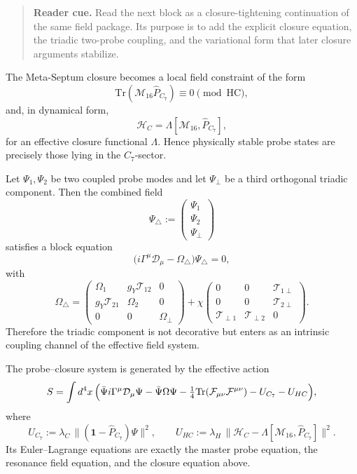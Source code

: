 \begin{quote}\small
\noindent\textbf{Reader cue.} Read the next block as a closure-tightening continuation of the same field package. Its purpose is to add the explicit closure equation, the triadic two-probe coupling, and the variational form that later closure arguments stabilize.
\end{quote}

\begin{proposition}
\label{prop:closure-equation}
The Meta-Septum closure becomes a local field constraint of the form
\[
  \mathrm{Tr}(\mathcal M_{16}\hat P_{C_7})
  \equiv 0 \pmod{\mathrm{HC}},
\]
and, in dynamical form,
\[
  \mathcal H_C = \Lambda[\mathcal M_{16},\hat P_{C_7}],
\]
for an effective closure functional $\Lambda$.
Hence physically stable probe states are precisely those lying in the
$C_7$-sector.
\end{proposition}

\begin{proposition}
\label{prop:triadic-two-probe}
Let $\Psi_1,\Psi_2$ be two coupled probe modes and let $\Psi_\perp$ be a
third orthogonal triadic component.
Then the combined field
\[
  \Psi_{\triangle}
  :=
  \begin{pmatrix}
    \Psi_1\\
    \Psi_2\\
    \Psi_\perp
  \end{pmatrix}
\]
satisfies a block equation
\[
  \bigl(i\Gamma^\mu\mathcal D_\mu - \Omega_{\triangle}\bigr)
  \Psi_{\triangle}=0,
\]
with
\[
  \Omega_{\triangle}
  =
  \begin{pmatrix}
    \Omega_1 & g_Y\mathcal T_{12} & 0\\
    g_Y\mathcal T_{21} & \Omega_2 & 0\\
    0 & 0 & \Omega_\perp
  \end{pmatrix}
  +
  \chi
  \begin{pmatrix}
    0 & 0 & \mathcal T_{1\perp}\\
    0 & 0 & \mathcal T_{2\perp}\\
    \mathcal T_{\perp1} & \mathcal T_{\perp2} & 0
  \end{pmatrix}.
\]
Therefore the triadic component is not decorative but enters as an
intrinsic coupling channel of the effective field system.
\end{proposition}

\begin{theorem}
\label{thm:variational-form}
The probe--closure system is generated by the effective action
\[
  S
  =
  \int d^4x\,
  \Bigl(
    \bar\Psi i\Gamma^\mu\mathcal D_\mu\Psi
    - \bar\Psi\Omega\Psi
    - \tfrac14\mathrm{Tr}(\mathcal F_{\mu\nu}\mathcal F^{\mu\nu})
    - U_{C_7}
    - U_{HC}
  \Bigr),
\]
where
\[
  U_{C_7}
  :=
  \lambda_C\,
  \bigl\|(\mathbf 1-\hat P_{C_7})\Psi\bigr\|^2,
  \qquad
  U_{HC}
  :=
  \lambda_H\,
  \bigl\|\mathcal H_C - \Lambda[\mathcal M_{16},\hat P_{C_7}]\bigr\|^2.
\]
Its Euler--Lagrange equations are exactly the master probe equation,
the resonance field equation, and the closure equation above.
\end{theorem}

